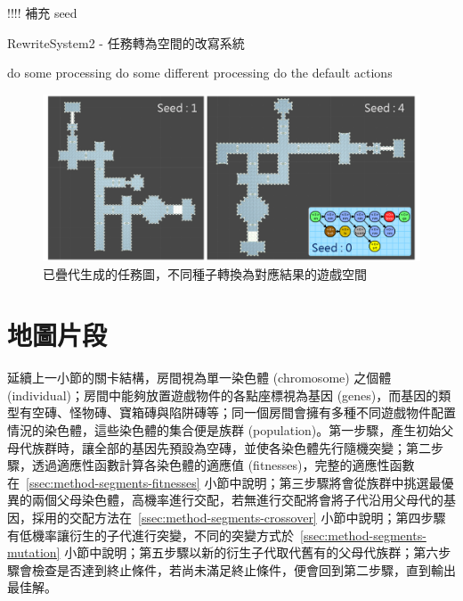 !!!! 補充 seed

\begin{algorithm}
    \caption{RewriteSystem2 - 任務轉為空間的改寫系統}
    \label{alg:algorithm-mission-to-space-rewritesystem}
    \begin{algorithmic}
            \STATE do some processing
            \STATE do some different processing
        \ELSE
            \STATE do the default actions
        \ENDIF
    \end{algorithmic}
\end{algorithm}

\begin{figure}[ht]
  \begin{center}
    \includegraphics[width=1.0\textwidth]{figures/mission-to-space-result.png}
    \caption{已疊代生成的任務圖，不同種子轉換為對應結果的遊戲空間} 
    \label{fig:mission-to-space-result}
  \end{center}
\end{figure}

\clearpage

\section{地圖片段}
\label{sec:method-segments}

延續上一小節的關卡結構，房間視為單一染色體 (chromosome) 之個體 (individual)；房間中能夠放置遊戲物件的各點座標視為基因 (genes)，而基因的類型有空磚、怪物磚、寶箱磚與陷阱磚等；同一個房間會擁有多種不同遊戲物件配置情況的染色體，這些染色體的集合便是族群 (population)。第一步驟，產生初始父母代族群時，讓全部的基因先預設為空磚，並使各染色體先行隨機突變；第二步驟，透過適應性函數計算各染色體的適應值 (fitnesses)，完整的適應性函數在~\ref{ssec:method-segments-fitnesses} 小節中說明；第三步驟將會從族群中挑選最優異的兩個父母染色體，高機率進行交配，若無進行交配將會將子代沿用父母代的基因，採用的交配方法在~\ref{ssec:method-segments-crossover} 小節中說明；第四步驟有低機率讓衍生的子代進行突變，不同的突變方式於~\ref{ssec:method-segments-mutation} 小節中說明；第五步驟以新的衍生子代取代舊有的父母代族群；第六步驟會檢查是否達到終止條件，若尚未滿足終止條件，便會回到第二步驟，直到輸出最佳解。

